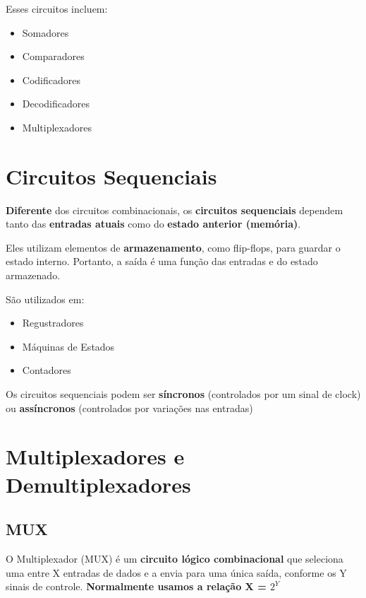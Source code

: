 \documentclass[12pt]{article}
\begin{document}
\vspace{0.5cm}

Esses circuitos incluem:

\begin{itemize}
   \item Somadores
   \item Comparadores
   \item Codificadores
   \item Decodificadores
   \item Multiplexadores
\end{itemize}

\section{Circuitos Sequenciais}

\textbf{Diferente} dos circuitos combinacionais, os \textbf{circuitos sequenciais} dependem tanto das \textbf{entradas atuais} como do \textbf{estado anterior (memória)}.

Eles utilizam elementos de \textbf{armazenamento}, como flip-flops, para guardar o estado interno. Portanto, a saída é uma função das entradas e do estado armazenado. 

\vspace{0.5cm}

São utilizados em:

\begin{itemize}
   \item Regustradores
   \item Máquinas de Estados
   \item Contadores
\end{itemize}

\vspace{0.5cm}

Os circuitos sequenciais podem ser \textbf{síncronos} (controlados por um sinal de clock) ou \textbf{assíncronos} (controlados por variações nas entradas)

\section{Multiplexadores e Demultiplexadores}

\subsection{MUX}
    
O Multiplexador (MUX) é um \textbf{circuito lógico combinacional} que seleciona uma entre X entradas de dados e a envia para uma única saída, conforme os Y sinais de controle.
\textbf{Normalmente usamos a relação X = $2^Y$} 
    
\end{document}
